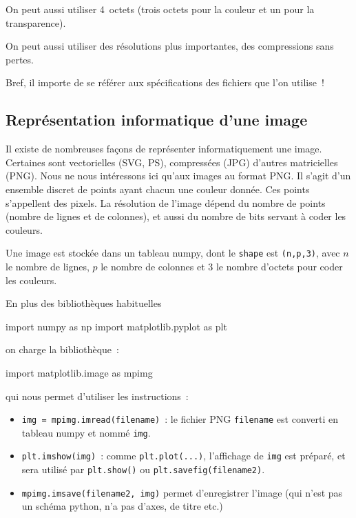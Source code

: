 \documentclass[10pt,fleqn]{article} %
\begin{document}
\begin{multicols}{2}


On peut aussi utiliser 4~octets (trois octets pour la couleur et un
pour la transparence).

On peut aussi utiliser des résolutions plus importantes, des
compressions sans pertes. 

Bref, il importe de se référer aux spécifications des fichiers que l'on
utilise~!

\subsection*{Représentation informatique d'une image}

Il existe de nombreuses façons de représenter informatiquement une
image. Certaines sont vectorielles (SVG, PS), compressées (JPG) d'autres
matricielles (PNG). Nous ne nous intéressons ici qu'aux images au
format PNG. Il s'agit d'un ensemble
discret de points ayant chacun une couleur donnée. Ces points
s'appellent des pixels. La résolution de
l'image dépend du nombre de points (nombre de lignes et de colonnes),
et aussi du nombre de bits servant à coder les couleurs.

Une image est stockée dans un tableau numpy, dont le
\texttt{shape} est \texttt{(n,p,3)}, avec $n$ le nombre de lignes, $p$
le nombre de colonnes et $3$ le nombre d'octets pour coder les
couleurs. 


En plus des bibliothèques habituelles
\begin{python}
import numpy as np
import matplotlib.pyplot as plt
\end{python}
on charge la bibliothèque~:
\begin{python}
import matplotlib.image as mpimg
\end{python}
qui nous permet d'utiliser les instructions~: 
\begin{itemize}
\item 
  \verb#img = mpimg.imread(filename)#~: le fichier PNG \verb#filename#
  est converti en tableau numpy et nommé \verb#img#.
\item 
  \verb#plt.imshow(img)#~: comme \verb#plt.plot(...)#, l'affichage de
  \verb#img# est préparé, et sera utilisé par \verb#plt.show()# ou
  \verb#plt.savefig(filename2)#.
\item
  \verb#mpimg.imsave(filename2, img)# permet d'enregistrer l'image
  (qui n'est pas un schéma python, n'a pas d'axes, de titre etc.)
\end{itemize}


\end{multicols}
\end{document}
